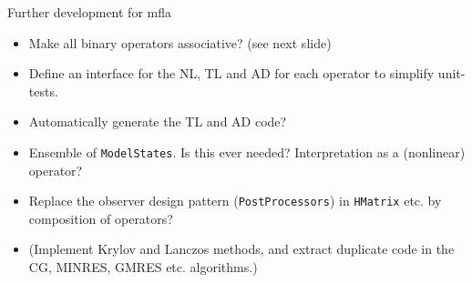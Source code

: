 \documentclass[9pt]{beamer}
\begin{document}
\begin{frame}[fragile]{Further development for mfla}

\begin{itemize}
  \item Make all binary operators associative? (see next slide)
  \item Define an interface for the NL, TL and AD for each operator to simplify unit-tests.
  \item Automatically generate the TL and AD code?
  \item Ensemble of \lstinline|ModelStates|. Is this ever needed? Interpretation as a (nonlinear) operator?
  \item Replace the observer design pattern (\lstinline|PostProcessors|) in \lstinline|HMatrix| etc. by composition of operators?
  \item (Implement Krylov and Lanczos methods, and extract duplicate code in the CG, MINRES, GMRES etc. algorithms.)
\end{itemize}


\end{frame}
\end{document}
